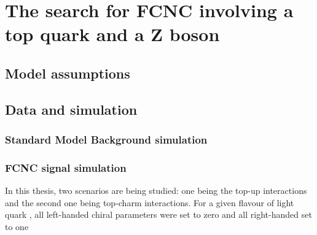 \chapter{The search for FCNC involving a top quark and a Z boson}
\section{Model assumptions}
\section{Data and simulation}
\subsection{Standard Model Background simulation}
\begin{comment}




The physics analysis
`Measurement of the top pair-production in association with a W or Z boson in pp collisions at 13 TeV`
(CADI entry TOP-17-005)
will be presented for approval at the physics meeting on Thu, May 4, 2017:

https://indico.cern.ch/event/635522/#12-top-17-005-measurement-of-t

The corresponding documentation can be found on CADI at:
http://cms.cern.ch/iCMS/analysisadmin/cadi?ancode=TOP-17-005


\end{comment}
\subsection{FCNC signal simulation}
In this thesis, two scenarios are being studied: one being the top-up interactions and the second one being top-charm interactions. For a given flavour of light quark \Pquark, all left-handed chiral parameters were set to zero and all right-handed set to one
